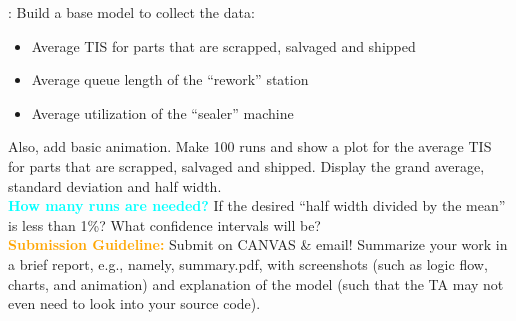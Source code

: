 \documentclass{article}
\begin{document}
\textit{\color{cyan}{Requirements}}: Build a base model to collect the data: 
\begin{itemize}
\item Average TIS for parts that are scrapped, salvaged and shipped
\item Average queue length of the ``rework'' station
\item Average utilization of the ``sealer'' machine
\end{itemize}

Also, add basic animation. Make 100 runs and show a plot for the average TIS for parts that are scrapped, salvaged and shipped. Display the grand average, standard deviation and half width. \\

\textcolor{cyan}{\bf How many runs are needed?} If the desired ``half width divided by the mean'' is less than 1\%? What confidence intervals will be? \\

\textcolor{orange}{\bf Submission Guideline:} Submit on CANVAS \& email! Summarize your work in a brief report, e.g., namely, summary.pdf, with screenshots (such as logic flow, charts, and animation) and explanation of the model (such that the TA may not even need to look into your source code). 
\end{document}
